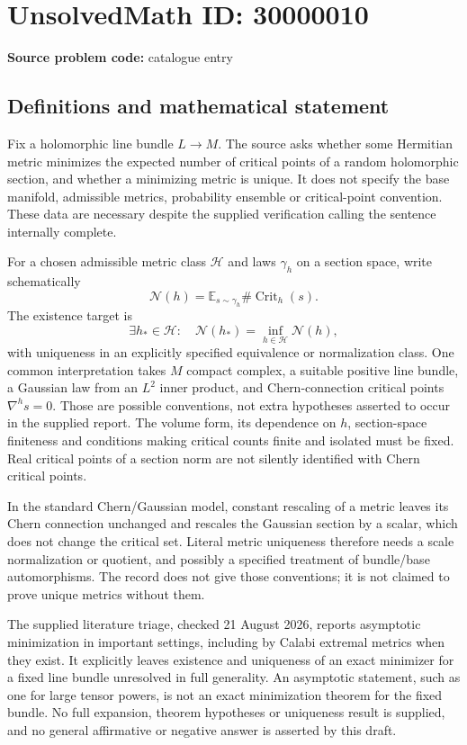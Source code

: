 \documentclass[11pt]{article}
\newcommand{\E}{\mathbb{E}}
\begin{document}
\section*{UnsolvedMath ID: 30000010}
\textbf{Source problem code:} catalogue entry
\subsection{Definitions and mathematical statement}
Fix a holomorphic line bundle $L\to M$. The source asks whether some Hermitian metric minimizes the expected number of critical points of a random holomorphic section, and whether a minimizing metric is unique. It does not specify the base manifold, admissible metrics, probability ensemble or critical-point convention. These data are necessary despite the supplied verification calling the sentence internally complete.

For a chosen admissible metric class $\mathcal H$ and laws $\gamma_h$ on a section space, write schematically
\[
 \mathcal N(h)=\E_{s\sim\gamma_h}\#\operatorname{Crit}_h(s).
\]
The existence target is
\[
 \exists h_*\in\mathcal H:\quad
 \mathcal N(h_*)=\inf_{h\in\mathcal H}\mathcal N(h),
\]
with uniqueness in an explicitly specified equivalence or normalization class. One common interpretation takes $M$ compact complex, a suitable positive line bundle, a Gaussian law from an $L^2$ inner product, and Chern-connection critical points $\nabla^h s=0$. Those are possible conventions, not extra hypotheses asserted to occur in the supplied report. The volume form, its dependence on $h$, section-space finiteness and conditions making critical counts finite and isolated must be fixed. Real critical points of a section norm are not silently identified with Chern critical points.

In the standard Chern/Gaussian model, constant rescaling of a metric leaves its Chern connection unchanged and rescales the Gaussian section by a scalar, which does not change the critical set. Literal metric uniqueness therefore needs a scale normalization or quotient, and possibly a specified treatment of bundle/base automorphisms. The record does not give those conventions; it is not claimed to prove unique metrics without them.

The supplied literature triage, checked 21 August 2026, reports asymptotic minimization in important settings, including by Calabi extremal metrics when they exist. It explicitly leaves existence and uniqueness of an exact minimizer for a fixed line bundle unresolved in full generality. An asymptotic statement, such as one for large tensor powers, is not an exact minimization theorem for the fixed bundle. No full expansion, theorem hypotheses or uniqueness result is supplied, and no general affirmative or negative answer is asserted by this draft.
\end{document}
